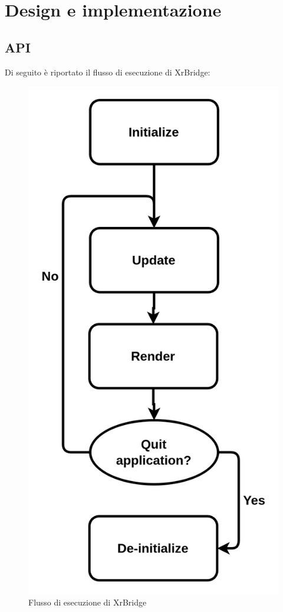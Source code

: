 \documentclass[twoside]{supsistudent}
\begin{document}
\chapter{Design e implementazione}


\section{API}

Di seguito è riportato il flusso di esecuzione di XrBridge:

\begin{figure}[h]
  \caption{Flusso di esecuzione di XrBridge}
  \centering
  \includegraphics[scale=0.2]{resources/flow.png}
\end{figure}
\end{document}
